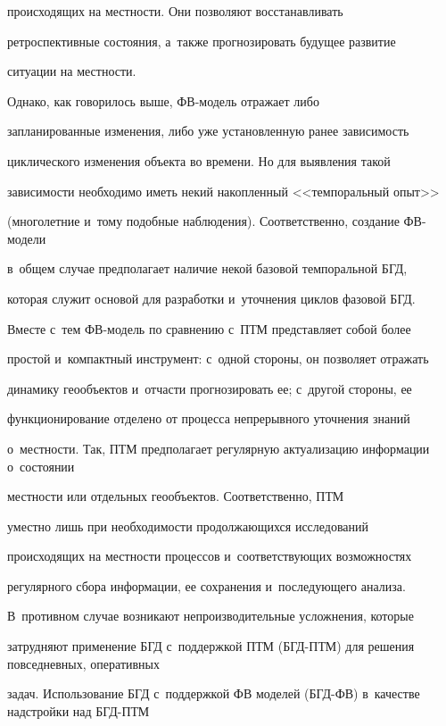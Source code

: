 происходящих на местности. Они позволяют восстанавливать 


ретроспективные со\-сто\-яния, а~так\-же прогнозировать будущее развитие 


ситуации на мест\-ности. 


  


  Однако, как говорилось выше, ФВ-мо\-де\-ль отражает либо 


запланированные изменения, либо уже установленную ранее за\-ви\-си\-мость 


цик\-ли\-че\-ско\-го изменения объекта во времени. Но для выявления такой 


за\-ви\-си\-мости необходимо иметь некий накопленный <<темпоральный опыт>> 


(многолетние и~тому подобные наблюдения). Соответственно, создание ФВ-мо\-де\-ли 


в~общем случае предполагает наличие некой базовой темпоральной БГД, 


которая служит основой для разработки и~уточнения цик\-лов фазовой БГД.


  


  Вместе с~тем ФВ-модель по сравнению с~ПТМ пред\-став\-ля\-ет собой более 


прос\-той и~компактный инструмент: с~одной стороны, он позволяет отражать 


динамику геообъектов и~отчасти прогнозировать ее; с~другой стороны, ее 


функционирование отделено от процесса непрерывного уточнения знаний 


о~мест\-ности. Так, ПТМ предполагает регулярную актуализацию информации о~со\-сто\-янии 


мест\-ности или отдельных геообъектов. Соответственно, ПТМ 


уместно лишь при не\-об\-хо\-ди\-мости про\-дол\-жа\-ющих\-ся исследований 


происходящих на местности процессов и~со\-от\-вет\-ст\-ву\-ющих возможностях 


регулярного сбора информации, ее сохранения и~последующего анализа. 


В~противном случае возникают непроизводительные усложнения, которые 


за\-труд\-ня\-ют применение БГД с~поддержкой ПТМ (БГД-ПТМ) для решения повседневных, оперативных 


задач. Использование БГД с~поддержкой ФВ моделей (БГД-ФВ) в~качестве надстройки над БГД-ПТМ 


